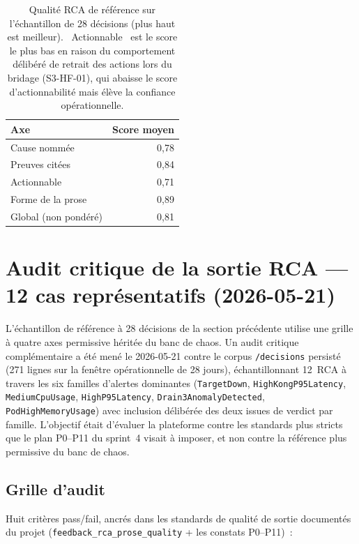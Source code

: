 \documentclass[11pt,a4paper,oneside]{report}
\begin{document}
\begin{table}[h]
\centering
\small
\begin{tabular}{lr}
\toprule
\textbf{Axe} & \textbf{Score moyen} \\
\midrule
Cause nommée       & 0,78 \\
Preuves citées    & 0,84 \\
Actionnable        & 0,71 \\
Forme de la prose       & 0,89 \\
\midrule
Global (non pondéré) & 0,81 \\
\bottomrule
\end{tabular}
\caption{Qualité RCA de référence sur l'échantillon de 28
décisions (plus haut est meilleur). \og~Actionnable~\fg{} est le
score le plus bas en raison du comportement délibéré de retrait
des actions lors du bridage (S3-HF-01), qui abaisse le score
d'actionnabilité mais élève la confiance opérationnelle.}
\label{tab:rca-quality}
\end{table}

\section{Audit critique de la sortie RCA --- 12 cas représentatifs (2026-05-21)}
\label{sec:critical-rca-audit}

L'échantillon de référence à 28 décisions de la section précédente
utilise une grille à quatre axes permissive héritée du banc de
chaos. Un audit critique complémentaire a été mené le 2026-05-21
contre le corpus \texttt{/decisions} persisté (271 lignes sur la
fenêtre opérationnelle de 28 jours), échantillonnant 12~RCA à
travers les six familles d'alertes dominantes
(\texttt{TargetDown}, \texttt{HighKongP95Latency},
\texttt{MediumCpuUsage}, \texttt{HighP95Latency},
\texttt{Drain3AnomalyDetected}, \texttt{PodHighMemoryUsage}) avec
inclusion délibérée des deux issues de verdict par famille.
L'objectif était d'évaluer la plateforme contre les standards plus
stricts que le plan P0--P11 du sprint~4 visait à imposer, et non
contre la référence plus permissive du banc de chaos.

\subsection{Grille d'audit}

Huit critères pass/fail, ancrés dans les standards de qualité de
sortie documentés du projet
(\texttt{feedback\_rca\_prose\_quality} + les constats P0--P11)~:
\end{document}
